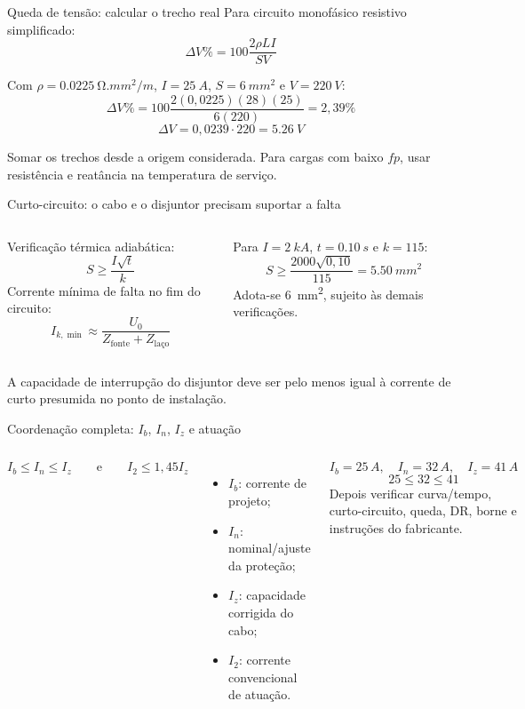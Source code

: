 \begin{frame}{Queda de tensão: calcular o trecho real}
\small
Para circuito monofásico resistivo simplificado:
\[
\Delta V\%=100\frac{2\rho L I}{SV}
\]
\begin{caixaEx}[title=Chuveiro a \SI{28}{m} do quadro]
Com $\rho=\SI{0.0225}{\ohm.mm^2/m}$, $I=\SI{25}{A}$, $S=\SI{6}{mm^2}$ e $V=\SI{220}{V}$:
\[
\Delta V\%=100\frac{2(0{,}0225)(28)(25)}{6(220)}=2{,}39\%
\]
\[
\Delta V=0{,}0239\cdot220=\SI{5.26}{V}
\]
\end{caixaEx}
\begin{caixaAt}
Somar os trechos desde a origem considerada. Para cargas com baixo $fp$, usar resistência e reatância na temperatura de serviço.
\end{caixaAt}
\end{frame}

\begin{frame}{Curto-circuito: o cabo e o disjuntor precisam suportar a falta}
\small
\begin{columns}[T,onlytextwidth]
Verificação térmica adiabática:
\[
S\geq\frac{I\sqrt{t}}{k}
\]
Corrente mínima de falta no fim do circuito:
\[
I_{k,\min}\approx\frac{U_0}{Z_{\text{fonte}}+Z_{\text{laço}}}
\]
\begin{caixaEx}[title=Exemplo térmico]
Para $I=\SI{2}{kA}$, $t=\SI{0.10}{s}$ e $k=115$:
\[
S\geq\frac{2000\sqrt{0{,}10}}{115}=\SI{5.50}{mm^2}
\]
Adota-se \SI{6}{mm^2}, sujeito às demais verificações.
\end{caixaEx}
\end{columns}
\begin{caixaAt}
A capacidade de interrupção do disjuntor deve ser pelo menos igual à corrente de curto presumida no ponto de instalação.
\end{caixaAt}
\end{frame}

\begin{frame}{Coordenação completa: $I_b$, $I_n$, $I_z$ e atuação}
\small
\begin{columns}[T,onlytextwidth]
\[
I_b\leq I_n\leq I_z
\qquad\text{e}\qquad
I_2\leq1{,}45I_z
\]
\begin{itemize}
\item $I_b$: corrente de projeto;
\item $I_n$: nominal/ajuste da proteção;
\item $I_z$: capacidade corrigida do cabo;
\item $I_2$: corrente convencional de atuação.
\end{itemize}
\begin{caixaEx}[title=Circuito de chuveiro]
\[
I_b=25\,A,\quad I_n=32\,A,\quad I_z=41\,A
\]
\[
25\leq32\leq41
\]
Depois verificar curva/tempo, curto-circuito, queda, DR, borne e instruções do fabricante.
\end{caixaEx}
\end{columns}
\end{frame}

